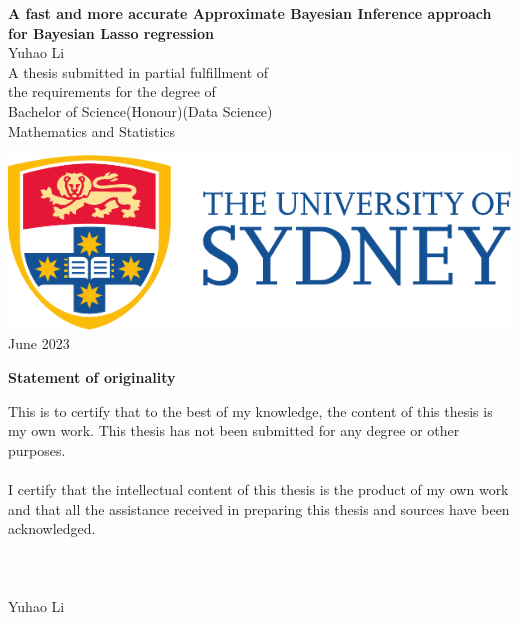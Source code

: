 \begin{titlepage}
\centering
{}
\vspace*{\fill}
\huge{\textbf{{\bf\Huge A fast and more accurate Approximate Bayesian Inference approach for Bayesian Lasso regression}}}\\



\vspace{2.5cm}
\LARGE{Yuhao Li}\\
\vspace{1.5cm}
\large{A thesis submitted in partial fulfillment of \\ the requirements for the degree of \\  Bachelor of Science(Honour)(Data Science)} \\
\vspace{1cm}
\large{Mathematics and Statistics}\\
\vspace{1.5cm}
\date{September 2021}
    \includegraphics[scale=0.75]{UsydLogo.pdf}\\
\vspace{1.5cm}
\large{June 2023}\\
\vspace*{\fill}

\thispagestyle{empty}
\end{titlepage}



\pagebreak
\hspace{0pt}
\begin{center}
    \textbf{\large Statement of originality}\\
    \vspace{0.5cm}
\end{center}

\noindent This is to certify that to the best of my knowledge, the content of this thesis is my own work. This thesis has not been submitted for any degree or other purposes.\\
\\
\noindent I certify that the intellectual content of this thesis is the product of my own work and that all the assistance received in preparing this thesis and sources have been acknowledged.\\
\\
\\
\\
Yuhao Li

